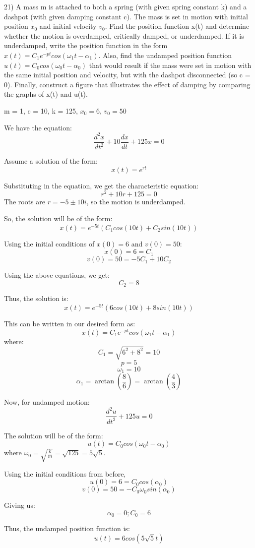 \documentclass{article}
\begin{document}
21) A mass m is attached to both a spring (with given spring constant k) and a dashpot (with given damping constant c).
The mass is set in motion with initial position $x_0$ and initial velocity $v_0$. Find the position function x(t) and
determine whether the motion is overdamped, critically damped, or underdamped. If it is underdamped, write the
position function in the form $x(t) = C_1 e^{-pt} cos(\omega_1 t - \alpha_1)$. Also, find the undamped
position function $u(t) = C_0 cos(\omega_0 t - \alpha_0)$ that would result if the mass were set in
motion with the same initial position and velocity, but with the dashpot disconnected (so c = 0).
Finally, construct a figure that illustrates the effect of damping by comparing the graphs of x(t) and u(t).

m = 1, c = 10, k = 125, $x_0 = 6$, $v_0 = 50$

We have the equation:
\[\frac{d^2 x}{d t^2} + 10 \frac{dx}{dt} + 125x = 0\]

Assume a solution of the form:
\[x(t) = e^{rt}\]

Substituting in the equation, we get the characteristic equation:
\[r^2 + 10r + 125 = 0\]
The roots are $r = -5 \pm 10i$, so the motion is underdamped.

So, the solution will be of the form:
\[x(t) = e^{-5t} (C_1 cos(10t) + C_2 sin(10t))\]

Using the initial conditions of $x(0) = 6$ and $v(0) = 50$:
\[x(0) = 6 = C_1\]
\[v(0) = 50 = -5C_1 + 10C_2\]

Using the above equations, we get:
\[C_2 = 8\]

Thus, the solution is:
\[x(t) = e^{-5t} (6cos(10t) + 8sin(10t))\]

This can be written in our desired form as:
\[x(t) = C_1 e^{-pt} cos(\omega_1 t - \alpha_1)\]
where:
\[C_1 = \sqrt{6^2 + 8^2} = 10\]
\[p = 5\]
\[\omega_1 = 10\]
\[\alpha_1 = \arctan \left( \frac{8}{6} \right) = \arctan \left( \frac{4}{3} \right)\]

Now, for undamped motion:
\[\frac{d^2 u}{dt^2} + 125u = 0\]

The solution will be of the form:
\[u(t) = C_0 cos(\omega_0 t - \alpha_0)\]
where $\omega_0 = \sqrt{\frac{k}{m}} = \sqrt{125} = 5 \sqrt{5}$.

Using the initial conditions from before,
\[u(0) = 6 = C_0 cos(\alpha_0)\]
\[v(0) = 50 = -C_0 \omega_0 sin(\alpha_0)\]

Giving us:
\[\alpha_0 = 0; C_0 = 6\]

Thus, the undamped position function is:
\[u(t) = 6cos(5\sqrt{5}t)\]
\end{document}
